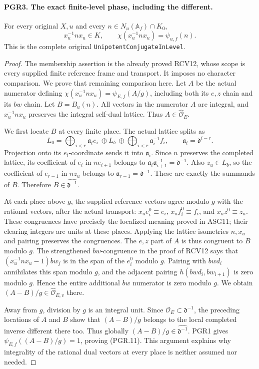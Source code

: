 \documentclass[11pt,a4paper]{article}
\numberwithin{equation}{section}
\theoremstyle{remark}\newtheorem{remark}[theorem]{Remark}
\begin{document}
\paragraph{PGR3. The exact finite-level phase, including the different.}
\label{claim:PGR3}
For every original \(X,u\) and every
\(n\in N_u(\mathbb A_f)\cap K_0\),
\[
 x_u^{-1}nx_u\in K,\qquad
             \chi(x_u^{-1}nx_u)=\psi_{u,f}(n).
\tag{PGR.11}
\]
This is the complete original \texttt{Unipotent\allowbreak Conjugate\allowbreak In\allowbreak Level}.
\begin{proof}
The membership assertion is the already proved RCV12, whose scope is
every supplied finite reference frame and transport.  It imposes no
character comparison.  We prove that remaining comparison here.
Let \(A\) be the actual numerator defining
\(\chi(x_u^{-1}nx_u)=\psi_{E,f}(A/g)\), including both its
\(e,z\) chain and its \(bw\) chain.  Let \(B=B_u(n)\).
All vectors in the numerator \(A\) are integral, and
\(x_u^{-1}nx_u\) preserves the integral self-dual lattice.
Thus \(A\in\widehat{\mathcal O}_E\).

We first locate \(B\) at every finite place.  The actual lattice
splits as
\[
 L_0=\bigoplus_{i<r}\mathfrak a_i e_i\ \oplus L_b\ \oplus
               \bigoplus_{i<r}\mathfrak a_i^{-1} f_i,
             \qquad \mathfrak a_i=\mathfrak d^{i-r}.
\tag{PGR.12}
\]
Projection onto its \(e_i\)-coordinate sends it into
\(\mathfrak a_i\).  Since \(n\) preserves the completed
lattice, its coefficient of \(e_i\) in \(ne_{i+1}\) belongs
to \(\mathfrak a_i\mathfrak a_{i+1}^{-1}=\mathfrak d^{-1}\).
Also \(z_u\in L_b\), so the coefficient of \(e_{r-1}\)
in \(nz_u\) belongs to \(\mathfrak a_{r-1}=\mathfrak d^{-1}\).
These are exactly the summands of \(B\).  Therefore
\(B\in\widehat{\mathfrak d^{-1}}\).

At each place above \(g\), the supplied reference vectors agree
modulo \(g\) with the rational vectors, after the actual transport:
\(x_ue_i^0\equiv e_i\), \(x_uf_i^0\equiv f_i\), and
\(x_uz^0\equiv z_u\).  These congruences have precisely the
localized meaning proved in ASG11; their clearing integers are units
at these places.  Applying the lattice isometries \(n,x_u\) and
pairing preserves the congruences.  The \(e,z\) part of \(A\)
is thus congruent to \(B\) modulo \(g\).  The strengthened
\(bw\)-congruence in the proof of RCV12 says that
\((x_u^{-1}nx_u-1)bw_j\) is in the span of the \(e_i^0\)
modulo \(g\).  Pairing with \(bwd_i\) annihilates this span
modulo \(g\), and the adjacent pairing
\(h(bwd_i,bw_{i+1})\) is zero modulo \(g\).  Hence the
entire additional \(bw\) numerator is zero modulo \(g\).
We obtain \((A-B)/g\in\widehat{\mathcal O}_{E,v}\) there.

Away from \(g\), division by \(g\) is an integral unit.
Since \(\mathcal O_E\subset\mathfrak d^{-1}\), the preceding
locations of \(A\) and \(B\) show that \((A-B)/g\) belongs
to the local completed inverse different there too.  Thus globally
\((A-B)/g\in\widehat{\mathfrak d^{-1}}\).  PGR1 gives
\(\psi_{E,f}((A-B)/g)=1\), proving (PGR.11).  This argument
explains why integrality of the rational dual vectors at every place
is neither assumed nor needed.
\end{proof}
\end{document}
